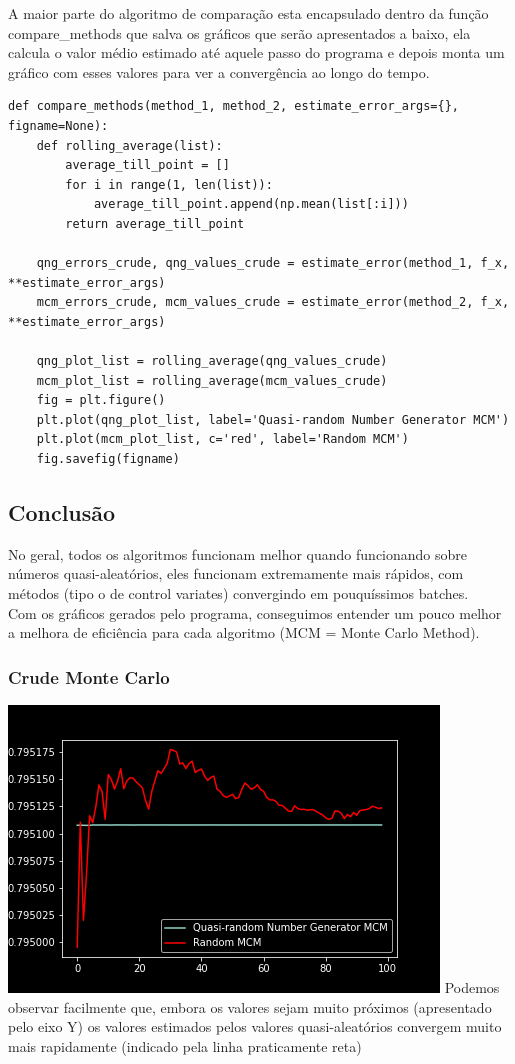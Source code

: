 \documentclass[twocolumn,amsmath,amssymb,floatfix]{revtex4}
\begin{document}
\indent A maior parte do algoritmo de comparação esta encapsulado dentro da função compare\_methods que salva os gráficos que serão apresentados a baixo, ela calcula o valor médio estimado até aquele passo do programa e depois monta um gráfico com esses valores para ver a convergência ao longo do tempo.
\begin{lstlisting}
def compare_methods(method_1, method_2, estimate_error_args={}, figname=None):
    def rolling_average(list):
        average_till_point = []
        for i in range(1, len(list)):
            average_till_point.append(np.mean(list[:i]))
        return average_till_point

    qng_errors_crude, qng_values_crude = estimate_error(method_1, f_x, **estimate_error_args)
    mcm_errors_crude, mcm_values_crude = estimate_error(method_2, f_x, **estimate_error_args)

    qng_plot_list = rolling_average(qng_values_crude)
    mcm_plot_list = rolling_average(mcm_values_crude)
    fig = plt.figure()
    plt.plot(qng_plot_list, label='Quasi-random Number Generator MCM')
    plt.plot(mcm_plot_list, c='red', label='Random MCM')
    fig.savefig(figname)
\end{lstlisting}
\subsection{Conclusão}
\indent No geral, todos os algoritmos funcionam melhor quando funcionando sobre números quasi-aleatórios, eles funcionam extremamente mais rápidos, com métodos (tipo o de control variates) convergindo em pouquíssimos batches.\\
\indent Com os gráficos gerados pelo programa, conseguimos entender um pouco melhor a melhora de eficiência para cada algoritmo (MCM = Monte Carlo Method).\\
\subsubsection{Crude Monte Carlo}
\includegraphics[scale=0.55]{CrudeComparison.png}
\indent Podemos observar facilmente que, embora os valores sejam muito próximos (apresentado pelo eixo Y) os valores estimados pelos valores quasi-aleatórios convergem muito mais rapidamente (indicado pela linha praticamente reta)
\end{document}
